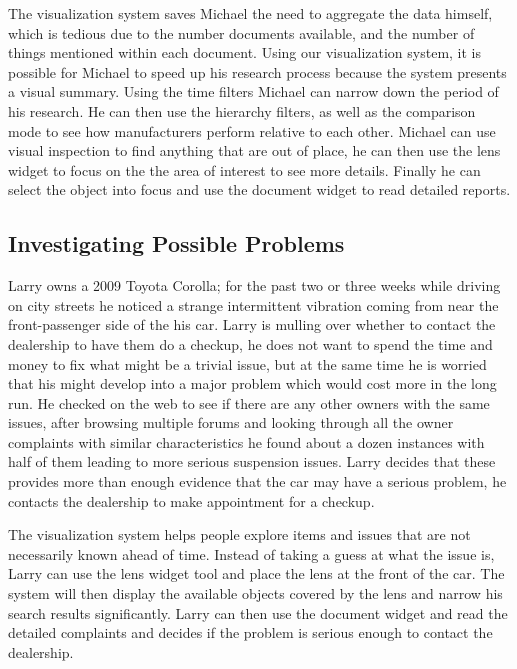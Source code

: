 The visualization system saves Michael the need to aggregate the data himself, which is tedious
due to the number documents available, and the number of things mentioned within
each document. Using our visualization system, it is possible for Michael to
speed up his research process because the system presents a visual summary. Using the time
filters Michael can narrow down the period of his research. He can then use the
hierarchy filters, as well as the comparison mode to see how manufacturers
perform relative to each other. Michael can use visual inspection to find
anything that are out of place, he can then use the lens widget to focus on the
the area of interest to see more details. Finally he can select the object into
focus and use the document widget to read detailed reports.


\subsection{Investigating Possible Problems}
Larry owns a 2009 Toyota Corolla; for the past two or three weeks while driving
on city streets he noticed a strange intermittent vibration coming from near the 
front-passenger side of the his car. Larry is mulling over whether to contact the 
dealership to have them do a checkup, he does not want to spend the time and
money to fix what might be a trivial issue, but at the same time he is worried that his 
might develop into a major problem which would cost more in the long run. He 
checked on the web to see if there are any other owners with the same issues, after 
browsing multiple forums and looking through all the owner complaints with similar 
characteristics he found about a dozen instances with half of them leading to more 
serious suspension issues. Larry decides that these provides more than enough evidence 
that the car may have a serious problem, he contacts the dealership to make 
appointment for a checkup.

The visualization system helps people explore items and issues that are not
necessarily known ahead of time. Instead of taking a guess at what the
issue is, Larry can use the lens widget tool and place the lens at the front of
the car.  The system will then display the available objects
covered by the lens and narrow his search results significantly. Larry can then
use the document widget and read the detailed complaints and decides if the
problem is serious enough to contact the dealership.

